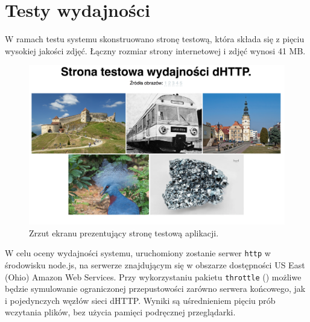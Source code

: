 \chapter{Testy wydajności}
\label{cha:testyIOptymalizacje}

W ramach testu systemu skonstruowano stronę testową, która składa się z pięciu wysokiej jakości zdjęć. Łączny rozmiar strony internetowej i zdjęć wynosi 41 MB.

\begin{figure}[h]
    \centering
    \includegraphics[scale=0.3]{perf-page.png}

    \caption{Zrzut ekranu prezentujący stronę testową aplikacji.}
    \label{fig:test-page}
\end{figure}

W celu oceny wydajności systemu, uruchomiony zostanie serwer \texttt{http} w środowisku node.js, na serwerze znajdującym się w obszarze dostępności US East (Ohio) Amazon Web Services. Przy wykorzystaniu pakietu \texttt{throttle} (\cite{npmThrottle}) możliwe będzie symulowanie ograniczonej przepustowości zarówno serwera końcowego, jak i pojedynczych węzłów sieci dHTTP. Wyniki są uśrednieniem pięciu prób wczytania plików, bez użycia pamięci podręcznej przeglądarki.


